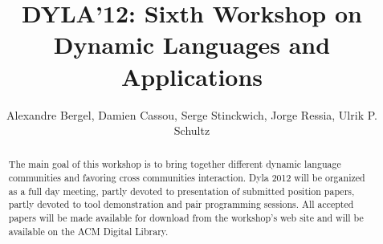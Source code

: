 \documentclass[runningheads]{llncs}
\begin{document}
\mainmatter

\title{DYLA'12: Sixth Workshop on Dynamic Languages and Applications}

\author{Alexandre Bergel, Damien Cassou, Serge Stinckwich, Jorge Ressia, Ulrik P. Schultz}






\maketitle

\begin{abstract}

The main goal of this workshop is to bring together different dynamic language communities and favoring cross communities interaction. Dyla 2012 will be organized as a full day meeting, partly devoted to presentation of submitted position papers, partly devoted to tool demonstration and pair programming sessions.  All accepted papers will be made available for download from the workshop's web site and will be available on the ACM Digital Library.

\end{abstract}
\end{document}
